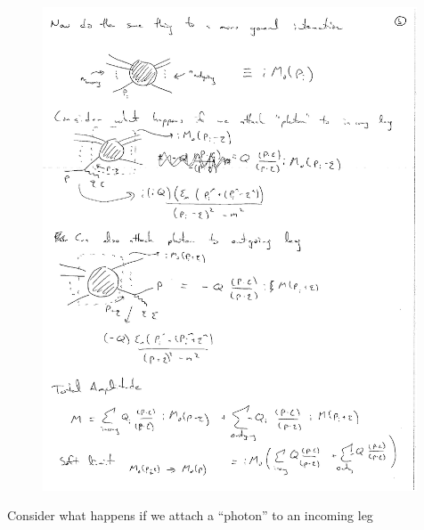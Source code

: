 {\begin{figure}[h]
\includegraphics[width=0.99\textwidth]{./generalScattering.pdf}
\end{figure}

Consider what happens if we attach a ``photon'' to an incoming leg

}
